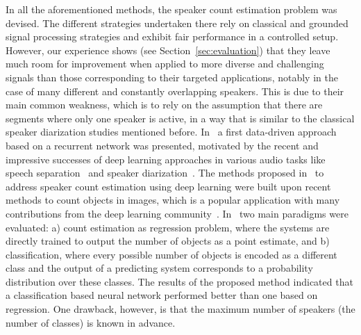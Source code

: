 In all the aforementioned methods, the speaker count estimation problem was devised.
The different strategies undertaken there rely on classical and grounded signal processing strategies and exhibit fair performance in a controlled setup.
However, our experience shows (see Section~\ref{sec:evaluation}) that they leave much room for improvement when applied to more diverse and challenging signals than those corresponding to their targeted applications, notably in the case of many different and constantly overlapping speakers.
This is due to their main common weakness, which is to rely on the assumption that there are segments where only one speaker is active, in a way that is similar to the classical speaker diarization studies mentioned before.
In~\cite{stoeter17} a first data-driven approach based on a recurrent network was presented, motivated by the recent and impressive successes of deep learning approaches in various audio tasks like speech separation~\cite{yu16, hershey16, grais17} and speaker diarization~\cite{yella14, hruz16, garciaromero17}.
The methods proposed in~\cite{stoeter17} to address speaker count estimation using deep learning were built upon recent methods to count objects in images, which is a popular application with many contributions from the deep learning community~\cite{wang15, chattopadhyay17, khan16, segui15, zhang15, arteta16, marsden16, boominathan16, zhang2015salient}.
In~\cite{stoeter17} two main paradigms were evaluated: a) count estimation as regression problem, where the systems are directly trained to output the number of objects as a point estimate, and b) classification, where every possible number of objects is encoded as a different class and the output of a predicting system corresponds to a probability distribution over these classes.
The results of the proposed method indicated that a classification based neural network performed better than one based on regression.
One drawback, however, is that the maximum number of speakers (the number of classes) is known in advance.


\par

